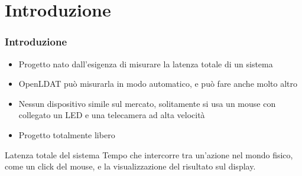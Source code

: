 \documentclass[xcolor={x11names}]{beamer}
\begin{document}
\hoffset=0mm %

\section{Introduzione}
\begin{frame}
	\frametitle{Introduzione}
	\begin{itemize}
		\item Progetto nato dall'esigenza di \alert{misurare la latenza totale di un sistema}
		\item \alert{OpenLDAT può misurarla in modo automatico}, e può fare anche molto altro
		\item \alert{Nessun dispositivo simile sul mercato}, solitamente si usa un mouse con collegato un LED e una telecamera ad alta velocità
		\item Progetto totalmente \alert{libero}
	\end{itemize}
	\begin{block}{Latenza totale del sistema}
		Tempo che intercorre tra un'azione nel mondo fisico, come un click del mouse, e la visualizzazione del risultato sul display.
	\end{block}
\end{frame}
\end{document}
